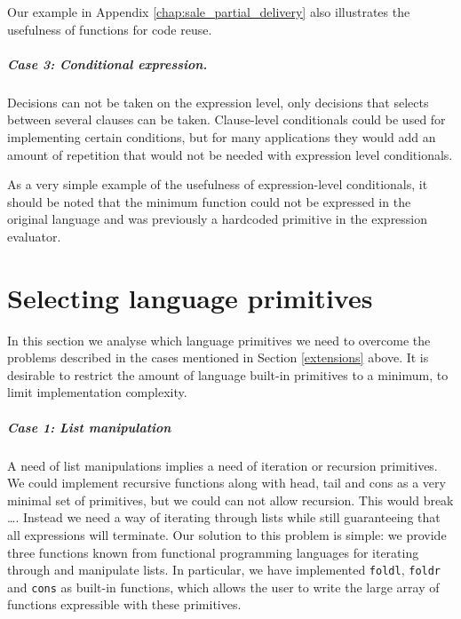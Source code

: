 \documentclass[10pt,a4paper,final,oneside,openany,article]{memoir}
\begin{document}
Our example in Appendix \ref{chap:sale_partial_delivery} also
illustrates the usefulness of functions for code reuse.

\paragraph{Case 3: Conditional expression.} Decisions can not be taken
on the expression level, only decisions that selects between several
clauses can be taken. Clause-level conditionals could be used for
implementing certain conditions, but for many applications they would
add an amount of repetition that would not be needed with expression
level conditionals. 

As a very simple example of the usefulness of expression-level
conditionals, it should be noted that the minimum function could not
be expressed in the original language and was previously a hardcoded
primitive in the expression evaluator.

\chapter{Selecting language primitives}
\label{primitives}
In this section we analyse which language primitives we need to
overcome the problems described in the cases mentioned in
Section \ref{extensions} above. It is desirable to restrict the amount of
language built-in primitives to a minimum, to limit implementation
complexity. 

\paragraph{Case 1: List manipulation}
A need of list manipulations implies a need of iteration or recursion
primitives. We could implement recursive functions along with head,
tail and cons as a very minimal set of primitives, but we could can
not allow recursion. This would break \ldots {}.  Instead we need a way of iterating through lists
while still guaranteeing that all expressions will terminate.  Our
solution to this problem is simple: we provide three functions known
from functional programming languages for iterating through and
manipulate lists. In particular, we have implemented
\lstinline{foldl}, \lstinline{foldr} and \lstinline{cons} as built-in
functions, which allows the user to write the large array of functions
expressible with these primitives.
\end{document}
